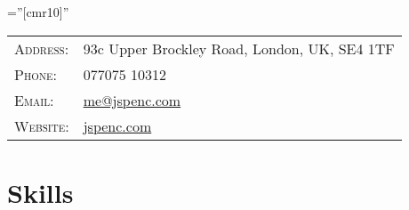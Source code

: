 \documentclass[a4paper,10pt]{article} %
\begin{document}
\pagestyle{empty} %

\font\fb=''[cmr10]'' %


\par{\bigskip\par} %
\hrulefill

\begin{tabular}{L{2cm}l}
\textsc{Address:} & 93c Upper Brockley Road, London, UK, SE4 1TF\\
\textsc{Phone:} & 077075 10312\\
\textsc{Email:} & \href{mailto:me@jspenc.com}{me@jspenc.com}\\
\textsc{Website:} & \href{jspenc.com}{jspenc.com} \\
\end{tabular}


\section{Skills}
\end{document}
